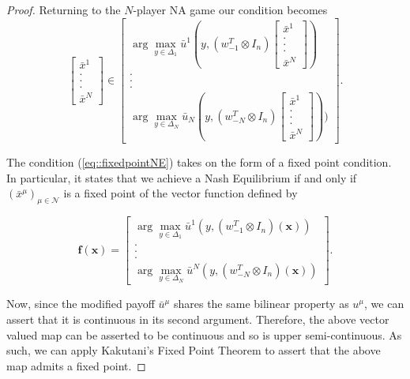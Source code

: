 \documentclass{article}
\theoremstyle{definition}
\newcommand{\agentset}{\mathcal{N}}
\newcommand{\NE}[1]{\bar{x}^{#1}}
\begin{document}
\begin{proof}
    Returning to the $N$-player NA game our condition becomes
    \begin{equation} \label{eq::fixedpointNE}
      \begin{bmatrix}
        \NE{1} \\ . \\ . \\ . \\ \NE{N}
      \end{bmatrix} \in
      \begin{bmatrix}
        \arg\max_{y \in \Delta_1} \bar{u}^1(y, (w_{-1}^T \otimes I_n) \begin{bmatrix}
          \NE{1} \\ . \\ . \\ . \\ \NE{N}
        \end{bmatrix}) \\ . \\ . \\ . \\ \arg\max_{y \in \Delta_N} \bar{u}_N(y, (w_{-N}^T \otimes I_n) \begin{bmatrix}
        \NE{1} \\ . \\ . \\ . \\ \NE{N}
      \end{bmatrix}))
      \end{bmatrix} .
    \end{equation}

    The condition (\ref{eq::fixedpointNE}) takes on the form of a fixed point condition. In particular, it states that we achieve a Nash Equilibrium if and only if $(\NE{\mu})_{\mu \in \agentset}$ is a fixed point of the vector function defined by
  
  
    \begin{equation}
    	\mathbf{f}(\mathbf{x}) = 
      \begin{bmatrix}
        \arg\max_{y \in \Delta_1} \bar{u}^1(y, (w_{-1}^T \otimes I_n) ( \mathbf{x} )) \\ . \\ . \\ . \\ \arg\max_{y \in \Delta_N} \bar{u}^N(y, (w_{-N}^T \otimes I_n)( \mathbf{x} ))
      \end{bmatrix} .
    \end{equation}


    Now, since the modified payoff $\bar{u}^\mu$ shares the same bilinear property as $u^\mu$, we can assert that it is continuous in its second argument. Therefore, the above vector valued map can be asserted to be continuous and so is upper semi-continuous. As such, we can apply Kakutani's Fixed Point Theorem to assert that the above map admits a fixed point.

  \end{proof}
\end{document}
